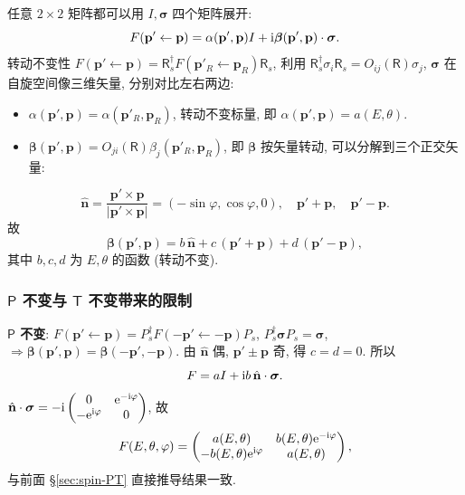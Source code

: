 任意 $2\times 2$ 矩阵都可以用 $I, \bm{\sigma}$ 四个矩阵展开:
\begin{equation}
F(\mathbf{p}'\leftarrow \mathbf{p})=\alpha(\mathbf{p}',\mathbf{p})I+\mathrm{i}\bm{\beta}(\mathbf{p}',\mathbf{p})\cdot \bm{\sigma}.
\end{equation}
转动不变性 $F(\mathbf{p}'\leftarrow \mathbf{p})=\mathsf{R}_s^\dagger F(\mathbf{p}'_R\leftarrow \mathbf{p}_R)\mathsf{R}_s$, 利用 $\mathsf{R}_s^\dagger \sigma_i \mathsf{R}_s=O_{ij}(\mathsf{R})\sigma_j$, $\bm{\sigma}$ 在自旋空间像三维矢量, 分别对比左右两边:
\begin{itemize}
  \item $\alpha(\mathbf{p}',\mathbf{p})=\alpha(\mathbf{p}'_R,\mathbf{p}_R)$, 转动不变标量, 即 $\alpha(\mathbf{p}',\mathbf{p})=a(E,\theta)$.
  \item $\bm{\beta}(\mathbf{p}',\mathbf{p})=O_{ji}(\mathsf{R})\beta_j(\mathbf{p}'_R,\mathbf{p}_R)$, 即 $\bm{\beta}$ 按矢量转动, 可以分解到三个正交矢量:
\end{itemize}
\[
\hat{\mathbf{n}}=\frac{\mathbf{p}'\times \mathbf{p}}{|\mathbf{p}'\times \mathbf{p}|}=(-\sin\varphi,\cos\varphi,0),\quad \mathbf{p}'+\mathbf{p},\quad \mathbf{p}'-\mathbf{p}.
\]
故
\begin{equation}
\bm{\beta}(\mathbf{p}',\mathbf{p})=b\,\hat{\mathbf{n}}+c\,(\mathbf{p}'+\mathbf{p})+d\,(\mathbf{p}'-\mathbf{p}),
\end{equation}
其中 $b,c,d$ 为 $E,\theta$ 的函数 (转动不变).

\subsubsection*{$\mathsf{P}$ 不变与 $\mathsf{T}$ 不变带来的限制}

\textbf{$\mathsf{P}$ 不变}: $F(\mathbf{p}'\leftarrow \mathbf{p})=P_s^\dagger F(-\mathbf{p}'\leftarrow -\mathbf{p})P_s$, $P_s^\dagger \bm{\sigma}P_s=\bm{\sigma}$, $\Rightarrow \bm{\beta}(\mathbf{p}',\mathbf{p})=\bm{\beta}(-\mathbf{p}',-\mathbf{p})$. 由 $\hat{\mathbf{n}}$ 偶, $\mathbf{p}'\pm\mathbf{p}$ 奇, 得 $c=d=0$. 所以
\begin{equation}
F=aI+\mathrm{i} b\,\hat{\mathbf{n}}\cdot\bm{\sigma}.
\end{equation}
$\hat{\mathbf{n}}\cdot \bm{\sigma}=-\mathrm{i} \begin{pmatrix}0& \mathrm{e}^{-\mathrm{i}\varphi}\\ -\mathrm{e}^{\mathrm{i} \varphi}& 0\end{pmatrix}$, 故
\[
F(E,\theta,\varphi)=\begin{pmatrix}a(E,\theta)& b(E,\theta)\mathrm{e}^{-\mathrm{i} \varphi}\\ -b(E,\theta)\mathrm{e}^{\mathrm{i} \varphi}& a(E,\theta)\end{pmatrix},
\]
与前面 \S\ref{sec:spin-PT} 直接推导结果一致.

